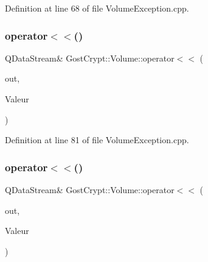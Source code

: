 Definition at line 68 of file Volume\+Exception.\+cpp.

\mbox{\label{namespace_gost_crypt_1_1_volume_a840c0f9f82f25dfd80302a3ef2af2e7c}} 
\subsubsection{\texorpdfstring{operator$<$$<$()}{operator<<()}\hspace{0.1cm}{\footnotesize\ttfamily [6/19]}}
{\footnotesize\ttfamily Q\+Data\+Stream\& Gost\+Crypt\+::\+Volume\+::operator$<$$<$ (\begin{DoxyParamCaption}\item[{Q\+Data\+Stream \&}]{out,  }\item[{const \hyperlink{class_gost_crypt_1_1_volume_1_1_encryption_algorithm_not_initialized}{Gost\+Crypt\+::\+Volume\+::\+Encryption\+Algorithm\+Not\+Initialized} \&}]{Valeur }\end{DoxyParamCaption})}



Definition at line 81 of file Volume\+Exception.\+cpp.

\mbox{\label{namespace_gost_crypt_1_1_volume_a6e4436c35dafba7a06771d7aaf129879}} 
\subsubsection{\texorpdfstring{operator$<$$<$()}{operator<<()}\hspace{0.1cm}{\footnotesize\ttfamily [7/19]}}
{\footnotesize\ttfamily Q\+Data\+Stream\& Gost\+Crypt\+::\+Volume\+::operator$<$$<$ (\begin{DoxyParamCaption}\item[{Q\+Data\+Stream \&}]{out,  }\item[{const \hyperlink{class_gost_crypt_1_1_volume_1_1_buffer_already_freed}{Gost\+Crypt\+::\+Volume\+::\+Buffer\+Already\+Freed} \&}]{Valeur }\end{DoxyParamCaption})}



